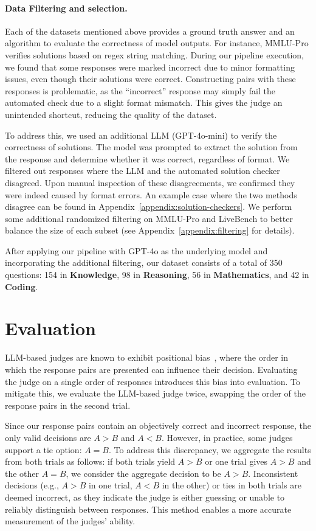 \documentclass{article} %
\begin{document}
\paragraph{Data Filtering and selection.}
Each of the datasets mentioned above provides a ground truth answer and an algorithm to evaluate the correctness of model outputs. For instance, MMLU-Pro verifies solutions based on regex string matching. During our pipeline execution, we found that some responses were marked incorrect due to minor formatting issues, even though their solutions were correct. Constructing pairs with these responses is problematic, as the ``incorrect'' response may simply fail the automated check due to a slight format mismatch. This gives the judge an unintended shortcut, reducing the quality of the dataset.

To address this, we used an additional LLM (GPT-4o-mini) to verify the correctness of solutions. The model was prompted to extract the solution from the response and determine whether it was correct, regardless of format. We filtered out responses where the LLM and the automated solution checker disagreed. Upon manual inspection of these disagreements, we confirmed they were indeed caused by format errors. An example case where the two methods disagree can be found in Appendix~\ref{appendix:solution-checkers}. We perform some additional randomized filtering on MMLU-Pro and LiveBench to better balance the size of each subset (see Appendix~\ref{appendix:filtering} for details).

After applying our pipeline with GPT-4o as the underlying model and incorporating the additional filtering, our dataset consists of a total of 350 questions: 154 in \textbf{Knowledge}, 98 in \textbf{Reasoning}, 56 in \textbf{Mathematics}, and 42 in \textbf{Coding}.

\section{Evaluation}
\label{para:evaluation-method}
LLM-based judges are known to exhibit positional bias~\citep{zheng2024judging, wang2023faireval}, where the order in which the response pairs are presented can influence their decision. Evaluating the judge on a single order of responses introduces this bias into evaluation. To mitigate this, we evaluate the LLM-based judge twice, swapping the order of the response pairs in the second trial. 

Since our response pairs contain an objectively correct and incorrect response, the only valid decisions are $A > B$ and $A < B$. However, in practice, some judges support a tie option: $A = B$. To address this discrepancy, we aggregate the results from both trials as follows: if both trials yield $A > B$ or one trial gives $A > B$ and the other $A = B$, we consider the aggregate decision to be $A > B$. Inconsistent decisions (e.g., $A > B$ in one trial, $A < B$ in the other) or ties in both trials are deemed incorrect, as they indicate the judge is either guessing or unable to reliably distinguish between responses. This method enables a more accurate measurement of the judges' ability. 
\end{document}
